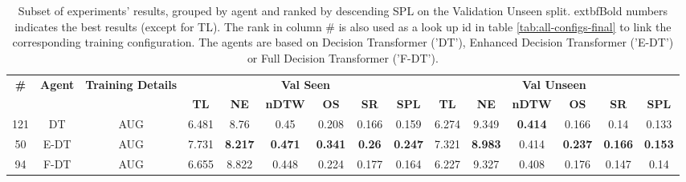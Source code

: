 \begin{table}
\centering
\caption{\label{tab:env_drop}Subset of experiments' results, grouped by agent and ranked by descending SPL on the Validation Unseen split. 	extbf{Bold} numbers indicates the best results (except for TL). The rank in column \# is also used as a look up id in table \ref{tab:all-configs-final} to link the corresponding training configuration.     \newline The agents are based on Decision Transformer ('DT'), Enhanced Decision Transformer ('E-DT') or Full Decision Transformer ('F-DT').}
\begin{tabular}{@{\hskip3pt}c@{\hskip3pt}c@{\hskip3pt}c@{\hskip3pt}c@{\hskip3pt}c@{\hskip3pt}c@{\hskip3pt}c@{\hskip3pt}c@{\hskip3pt}c@{\hskip3pt}c@{\hskip3pt}c@{\hskip3pt}c@{\hskip3pt}c@{\hskip3pt}c@{\hskip3pt}c}
\toprule
\textbf{\#} & \textbf{Agent} & \textbf{Training Details} & \multicolumn{6}{c}{\textbf{Val Seen}} & \multicolumn{6}{c}{\textbf{Val Unseen}} \\
 \textbf{~} &     \textbf{~} &                \textbf{~} &       \textbf{TL} &     \textbf{NE} &   \textbf{nDTW} &     \textbf{OS} &    \textbf{SR} &    \textbf{SPL} &         \textbf{TL} &     \textbf{NE} &   \textbf{nDTW} &     \textbf{OS} &     \textbf{SR} &    \textbf{SPL} \\
\midrule
        121 &             DT &                       AUG &             6.481 &            8.76 &            0.45 &           0.208 &          0.166 &           0.159 &               6.274 &           9.349 &  \textbf{0.414} &           0.166 &            0.14 &           0.133 \\
         50 &           E-DT &                       AUG &             7.731 &  \textbf{8.217} &  \textbf{0.471} &  \textbf{0.341} &  \textbf{0.26} &  \textbf{0.247} &               7.321 &  \textbf{8.983} &           0.414 &  \textbf{0.237} &  \textbf{0.166} &  \textbf{0.153} \\
         94 &           F-DT &                       AUG &             6.655 &           8.822 &           0.448 &           0.224 &          0.177 &           0.164 &               6.227 &           9.327 &           0.408 &           0.176 &           0.147 &            0.14 \\
\bottomrule
\end{tabular}
\end{table}
